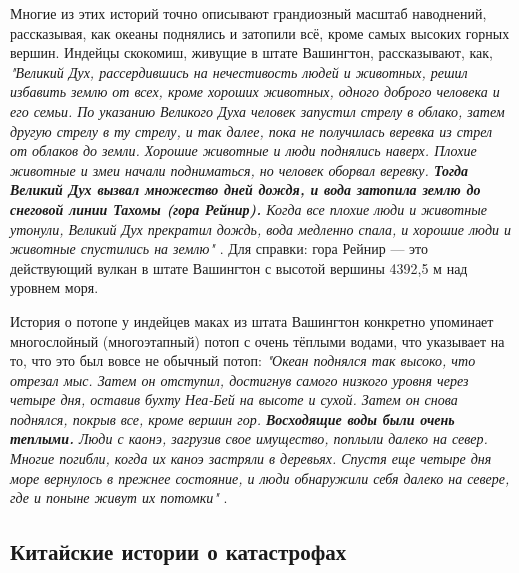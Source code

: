 \documentclass[10pt,twocolumn,letterpaper]{article}
\begin{document}
Многие из этих историй точно описывают грандиозный масштаб наводнений, рассказывая, как океаны поднялись и затопили всё, кроме самых высоких горных вершин. Индейцы скокомиш, живущие в штате Вашингтон, рассказывают, как, \textit{"Великий Дух, рассердившись на нечестивость людей и животных, решил избавить землю от всех, кроме хороших животных, одного доброго человека и его семьи. По указанию Великого Духа человек запустил стрелу в облако, затем другую стрелу в ту стрелу, и так далее, пока не получилась веревка из стрел от облаков до земли. Хорошие животные и люди поднялись наверх. Плохие животные и змеи начали подниматься, но человек оборвал веревку. \textbf{Тогда Великий Дух вызвал множество дней дождя, и вода затопила землю до снеговой линии Тахомы (гора Рейнир).} Когда все плохие люди и животные утонули, Великий Дух прекратил дождь, вода медленно спала, и хорошие люди и животные спустились на землю"} \cite{3}. Для справки: гора Рейнир — это действующий вулкан в штате Вашингтон с высотой вершины 4392,5 м над уровнем моря.

История о потопе у индейцев маках из штата Вашингтон конкретно упоминает многослойный (многоэтапный) потоп с очень тёплыми водами, что указывает на то, что это был вовсе не обычный потоп: \textit{"Океан поднялся так высоко, что отрезал мыс. Затем он отступил, достигнув самого низкого уровня через четыре дня, оставив бухту Неа-Бей на высоте и сухой. Затем он снова поднялся, покрыв все, кроме вершин гор. \textbf{Восходящие воды были очень теплыми.} Люди с каонэ, загрузив свое имущество, поплыли далеко на север. Многие погибли, когда их каноэ застряли в деревьях. Спустя еще четыре дня море вернулось в прежнее состояние, и люди обнаружили себя далеко на севере, где и поныне живут их потомки"} \cite{3}.

\subsection{Китайские истории о катастрофах}
\end{document}
